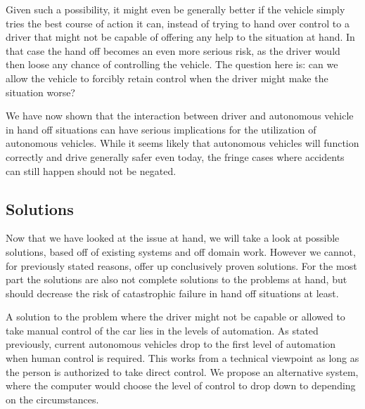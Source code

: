 \documentclass{acm_proc_article-sp}
\begin{document}
Given such a possibility, it might even be generally better if the vehicle simply tries the best course of action it can, instead of trying to hand over control to a driver that might not be capable of offering any help to the situation at hand.
In that case the hand off becomes an even more serious risk, as the driver would then loose any chance of controlling the vehicle.
The question here is: can we allow the vehicle to forcibly retain control when the driver might make the situation worse?

We have now shown that the interaction between driver and autonomous vehicle in hand off situations can have serious implications for the utilization of autonomous vehicles.
While it seems likely that autonomous vehicles will function correctly and drive generally safer even today, the fringe cases where accidents can still happen should not be negated.

\subsection{Solutions}
\label{solutions}

Now that we have looked at the issue at hand, we will take a look at possible solutions, based off of existing systems and off domain work.
However we cannot, for previously stated reasons, offer up conclusively proven solutions.
For the most part the solutions are also not complete solutions to the problems at hand, but should decrease the risk of catastrophic failure in hand off situations at least.

A solution to the problem where the driver might not be capable or allowed to take manual control of the car lies in the levels of automation.
As stated previously, current autonomous vehicles drop to the first level of automation when human control is required.
This works from a technical viewpoint as long as the person is authorized to take direct control.
We propose an alternative system, where the computer would choose the level of control to drop down to depending on the circumstances.
\end{document}
